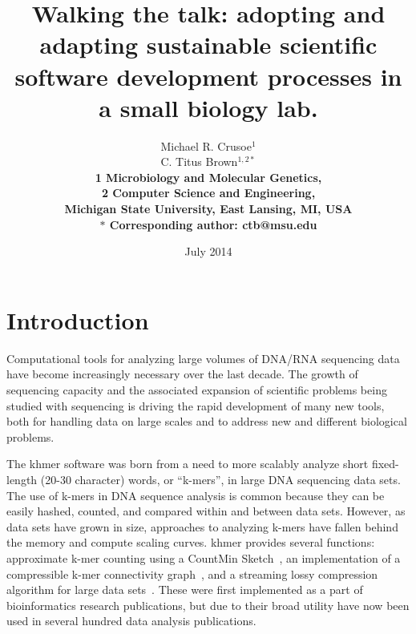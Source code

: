 \documentclass[12pt]{article}
\date{July 2014}
\title{Walking the talk: adopting and adapting sustainable scientific software
  development processes in a small biology lab.}
\author{Michael R. Crusoe$^{1}$\\
C. Titus Brown$^{1,2\ast}$\\
\small \bf{1} Microbiology and Molecular Genetics,\\
\small \bf{2} Computer Science and Engineering,\\
\small Michigan State University, East Lansing, MI, USA\\
\small $\ast$ Corresponding author: ctb@msu.edu}
\begin{document}
\maketitle
\thispagestyle{firststyle}


\setlength{\parindent}{0pt}
\setlength{\parskip}{0.70ex}

\section{Introduction}
Computational tools for analyzing large volumes of DNA/RNA sequencing data
have become increasingly necessary over the last decade.  The growth
of sequencing capacity and the associated expansion of scientific
problems being studied with sequencing is driving the rapid development of
many new tools, both for handling data on large scales and to address
new and different biological problems.

The khmer software was born from a need to more scalably analyze short
fixed-length (20-30 character) words, or ``k-mers'', in large DNA
sequencing data sets. The use of k-mers in DNA sequence analysis is
common because they can be easily hashed, counted, and compared within
and between data sets.  However, as data sets have grown in size,
approaches to analyzing k-mers have fallen behind the memory and
compute scaling curves.  khmer provides several functions: approximate
k-mer counting using a CountMin Sketch~\cite{Zhang2014}, an
implementation of a compressible k-mer connectivity
graph~\cite{Pell2012}, and a streaming lossy compression algorithm for
large data sets~\cite{diginorm}.  These were first implemented as a
part of bioinformatics research publications, but due to their broad
utility have now been used in several hundred data analysis
publications.
\end{document}
